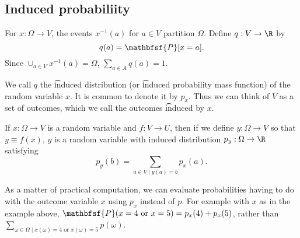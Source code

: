 \subsection*{Induced probabiliity}

For $x: \Omega  \to V$, the events $x^{-1}(a)$ for $a \in V$ partition $\Omega $.
Define $q: V \to \R $ by
  \[
q(a) = \mathbfsf{P} [x = a].
  \]
Since $\cup_{a \in V} x^{-1}(a) = \Omega $, $\sum_{a \in A} q(a) = 1$.

We call $q$ the \t{induced distribution} (or \t{induced probability mass function}) of the random variable $x$.
It is common to denote it by $p_{x}$.
Thus we can think of $V$ as a set of outcomes, which we call the outcomes \t{induced} by $x$.

If $x: \Omega  \to V$ is a random variable and $f: V \to U$, then if we define $y: \Omega  \to V$ so that $y \equiv f(x)$, $y$ is a random variable with induced distribution $p_{y}: \Omega  \to \R $ satisfying
  \[
\textstyle
p_{y}(b) = \sum_{a \in V \mid y(a) = b} p_x(a).
  \]

As a matter of practical computation, we can evaluate probabilities having to do with the outcome variable $x$ using $p_x$ instead of $p$.
For example with $x$ as in the example above, $\mathbfsf{P} (x = 4 \text{ or } x = 5) = p_x(4) + p_x(5)$, rather than $\sum_{\omega  \in \Omega  \mid x(\omega ) = 4 \text{ or } x(\omega ) = 5} p(\omega )$.
